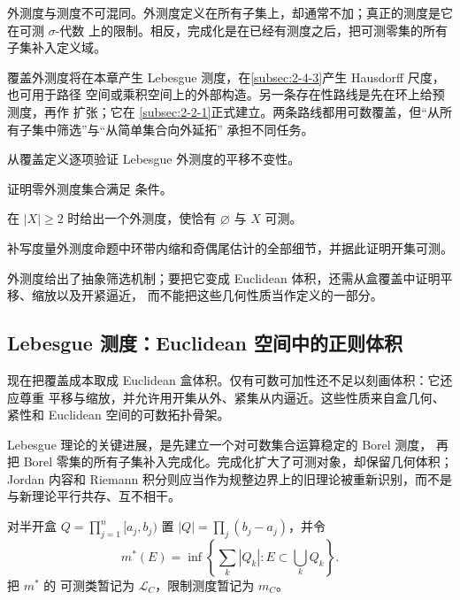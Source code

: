 \begin{remark}
外测度与测度不可混同。外测度定义在所有子集上，却通常不加；真正的测度是它在可测 $\sigma$-代数
上的限制。相反，完成化是在已经有测度之后，把可测零集的所有子集补入定义域。
\end{remark}

覆盖外测度将在本章产生 Lebesgue 测度，在\cref{subsec:2-4-3}产生 Hausdorff 尺度，也可用于路径
空间或乘积空间上的外部构造。另一条存在性路线是先在环上给预测度，再作 \Caratheodory{} 扩张；它在
\cref{subsec:2-2-1}正式建立。两条路线都用可数覆盖，但“从所有子集中筛选”与“从简单集合向外延拓”
承担不同任务。

\begin{exercise}
从覆盖定义逐项验证 Lebesgue 外测度的平移不变性。
\end{exercise}
\begin{exercise}
证明零外测度集合满足 \Caratheodory{} 条件。
\end{exercise}
\begin{exercise}
在 $|X|\ge2$ 时给出一个外测度，使恰有 $\varnothing$ 与 $X$ 可测。
\end{exercise}
\begin{exercise}
补写度量外测度命题中环带内缩和奇偶尾估计的全部细节，并据此证明开集可测。
\end{exercise}

外测度给出了抽象筛选机制；要把它变成 Euclidean 体积，还需从盒覆盖中证明平移、缩放以及开紧逼近，
而不能把这些几何性质当作定义的一部分。

\subsection{Lebesgue 测度：Euclidean 空间中的正则体积}\label{subsec:2-1-3}

现在把覆盖成本取成 Euclidean 盒体积。仅有可数可加性还不足以刻画体积：它还应尊重
平移与缩放，并允许用开集从外、紧集从内逼近。这些性质来自盒几何、紧性和
Euclidean 空间的可数拓扑骨架。

Lebesgue 理论的关键进展，是先建立一个对可数集合运算稳定的 Borel 测度，
再把 Borel 零集的所有子集补入完成化。完成化扩大了可测对象，却保留几何体积；Jordan 内容和 Riemann
积分则应当作为规整边界上的旧理论被重新识别，而不是与新理论平行共存、互不相干。

\begin{definition}\label{def:2-1-3-1}
对半开盒 $Q=\prod_{j=1}^n[a_j,b_j)$ 置 $|Q|=\prod_j(b_j-a_j)$，并令
\[
 m^*(E)=\inf\left\{\sum_k|Q_k|:E\subset\bigcup_kQ_k\right\}.
\]
把 $m^*$ 的 \Caratheodory{} 可测类暂记为 $\mathcal L_C$，限制测度暂记为 $m_C$。
\end{definition}

